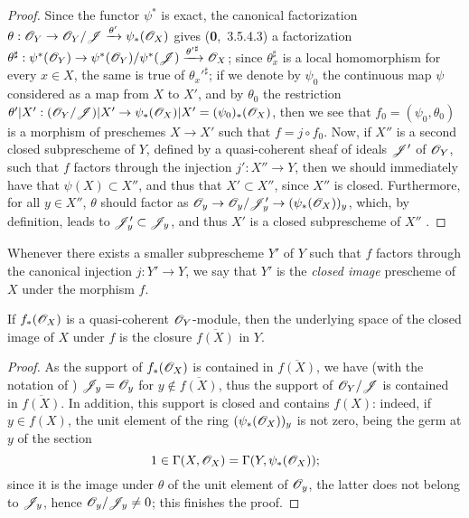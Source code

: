 \begin{proof}
\label{proof-1.9.5.2}
Since the functor $\psi^*$ is exact, the canonical factorization
$\theta:\sh{O}_Y\to\sh{O}_Y/\sh{J}\xrightarrow{\theta'}\psi_*(\sh{O}_X)$ gives (\textbf{0},~3.5.4.3)
a factorization
$\theta^\sharp:\psi^*(\sh{O}_Y)\to\psi^*(\sh{O}_Y)/\psi^*(\sh{J})
  \xrightarrow{{\theta'}^\sharp}\sh{O}_X$; since $\theta_x^\sharp$ is a local homomorphism for
every $x\in X$, the same is true of ${\theta_x'}^\sharp$; if we denote by $\psi_0$ the
continuous map $\psi$ considered as a map from $X$ to $X'$, and by $\theta_0$ the restriction
$\theta'|X':(\sh{O}_Y/\sh{J})|X'\to\psi_*(\sh{O}_X)|X'=(\psi_0)_*(\sh{O}_X)$, then we see that
$f_0=(\psi_0,\theta_0)$ is a morphism of preschemes $X\to X'$  such that
$f=j\circ f_0$. Now, if $X''$ is
a second closed subprescheme of $Y$, defined by a quasi-coherent sheaf of ideals $\mathscr{J}'$ of
$\mathscr{O}_Y$, such that $f$ factors through the injection $j':X''\to Y$, then we should
immediately have that $\psi(X)\subset X''$, and thus that $X'\subset X''$, since $X''$ is closed.
Furthermore, for all $y\in X''$, $\theta$ should factor as
$\sh{O}_y\to\sh{O}_y/\sh{J}'_y\to(\psi_*(\sh{O}_X))_y$, which, by definition, leads to
$\mathscr{J}'_y\subset\mathscr{J}_y$, and thus $X'$ is a closed subprescheme of $X''$
.
\end{proof}

\begin{definition}[9.5.3]
\label{1.9.5.3}
Whenever there exists a smaller subprescheme $Y'$ of $Y$ such that $f$ factors
through the canonical injection $j:Y'\to Y$, we say that $Y'$ is the
\emph{closed image} prescheme of $X$ under the morphism $f$.
\end{definition}

\begin{proposition}[9.5.4]
\label{1.9.5.4}
If $f_*(\mathscr{O}_X)$ is a quasi-coherent $\mathscr{O}_Y$-module, then the underlying space of
the closed image of $X$ under $f$ is the closure $\overline{f(X)}$ in $Y$.
\end{proposition}

\begin{proof}
\label{proof-1.9.5.4}
As the support of $f_*(\mathscr{O}_X)$ is contained in $\overline{f(X)}$, we have (with
the notation of ) $\mathscr{J}_y=\mathscr{O}_y$ for
$y\not\in\overline{f(X)}$, thus the support of $\mathscr{O}_Y/\mathscr{J}$ is contained in
$\overline{f(X)}$. In addition, this support is closed and contains $f(X)$:
indeed, if $y\in f(X)$, the unit element of the ring $(\psi_*(\mathscr{O}_X))_y$ is not
zero, being the germ at $y$ of the section
\[
  1\in\Gamma(X,\mathscr{O}_X)=\Gamma(Y,\psi_*(\mathscr{O}_X));
\]
since it is the image under $\theta$ of the unit element of $\mathscr{O}_y$, the latter
does not belong to $\mathscr{J}_y$, hence $\mathscr{O}_y/\mathscr{J}_y\neq 0$; this finishes the
proof.
\end{proof}

